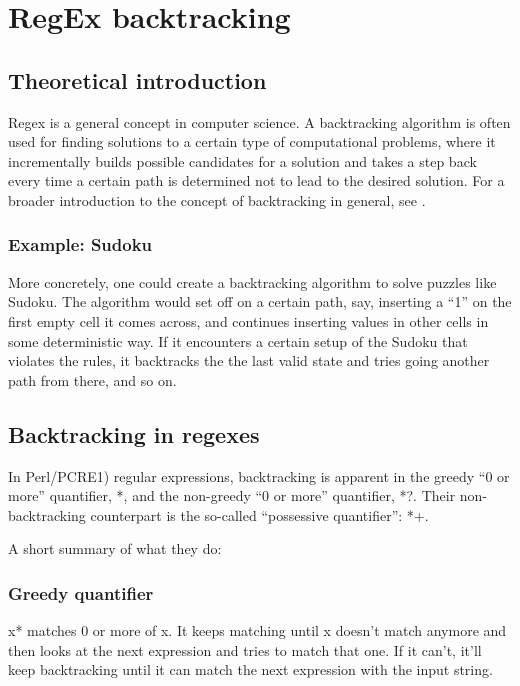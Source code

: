 \chapter{RegEx backtracking}
\section{Theoretical introduction}

Regex is a general concept in computer science. A backtracking algorithm is often used for finding solutions to a certain type of computational problems, where it incrementally builds possible candidates for a solution and takes a step back every time a certain path is determined not to lead to the desired solution. For a broader introduction to the concept of backtracking in general, see \cite{backtracking-wikipedia-backtracking}.

\subsection{Example: Sudoku}

More concretely, one could create a backtracking algorithm to solve puzzles like Sudoku. The algorithm would set off on a certain path, say, inserting a “1” on the first empty cell it comes across, and continues inserting values in other cells in some deterministic way. If it encounters a certain setup of the Sudoku that violates the rules, it backtracks the the last valid state and tries going another path from there, and so on. 


\section{Backtracking in regexes}

In Perl/PCRE1)\cite{backtracking-perl_pcre} regular expressions, backtracking is apparent in the greedy “0 or more” quantifier, *, and the non-greedy “0 or more” quantifier, *?. Their non-backtracking counterpart is the so-called “possessive quantifier”: *+.

A short summary of what they do:

\subsection{Greedy quantifier}

x* matches 0 or more of x. It keeps matching until x doesn't match anymore and then looks at the next expression and tries to match that one. If it can't, it'll keep backtracking until it can match the next expression with the input string.

